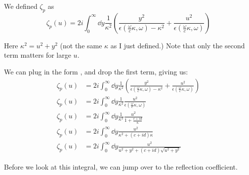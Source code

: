 \documentclass[11pt]{article}
\begin{document}
	We defined $\zeta_p$ as
	\begin{equation}
		\zeta_p(u) = 2i \int_0^\infty \dd{y} \frac{1}{\kappa^2} \left( \frac{y^2}{\epsilon(\frac{\omega}{c}\kappa, \omega) - \kappa^2} + \frac{u^2}{\epsilon(\frac{\omega}{c}\kappa, \omega)} \right)
	\end{equation}

	Here $\kappa^2 = u^2 + y^2$ (not the same $\kappa$ as I just defined.)
	Note that only the second term matters for large $u$.

	We can plug in the form , and drop the first term, giving us:
	\begin{align}
		\zeta_p(u) &= 2i \int_0^\infty \dd{y} \frac{1}{\kappa^2} \left( \frac{y^2}{\epsilon(\frac{\omega}{c}\kappa, \omega) - \kappa^2} + \frac{u^2}{\epsilon(\frac{\omega}{c}\kappa, \omega)} \right) \\
		\zeta_p(u) &= 2i \int_0^\infty \dd{y} \frac{1}{\kappa^2} \frac{u^2}{\epsilon(\frac{\omega}{c}\kappa, \omega)} \\
		\zeta_p(u) &= 2i \int_0^\infty \dd{y} \frac{1}{\kappa^2} \frac{u^2}{1 + \frac{c + i d}{\kappa}} \\
		\zeta_p(u) &= 2i \int_0^\infty \dd{y} \frac{u^2}{\kappa^2 + (c + id)\kappa} \\
		\zeta_p(u) &= 2i \int_0^\infty \dd{y} \frac{u^2}{u^2 + y^2 + (c + id)\sqrt{u^2 + y^2}} \label{eq:zetaPreZ}
	\end{align}

	Before we look at this integral, we can jump over to the reflection coefficient.
\end{document}

